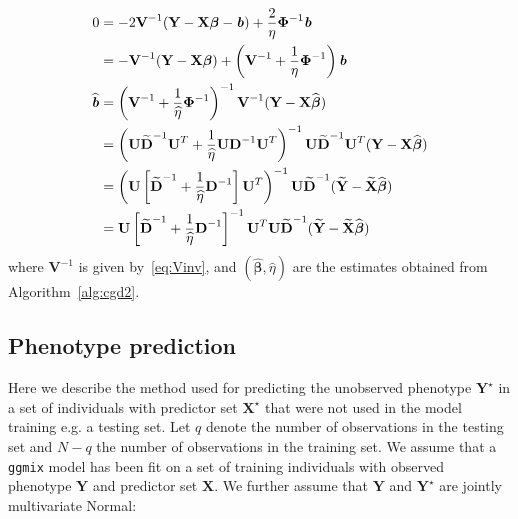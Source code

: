 \documentclass[12pt,letter]{article}\usepackage[]{graphicx}\usepackage[]{color}
\newcommand{\bX}{\textbf{X}}
\newcommand{\bY}{\textbf{Y}}
\newcommand{\bD}{\textbf{D}}
\newcommand{\bXtilde}{\widetilde{\bX}}
\newcommand{\bYtilde}{\widetilde{\bY}}
\newcommand{\bDtilde}{\widetilde{\bD}}
\newcommand{\bU}{\textbf{U}}
\newcommand{\bV}{\textbf{V}}
\newcommand{\bb}{\textbf{\emph{b}}}
\newcommand{\bbeta}{\boldsymbol{\beta}}
\newcommand{\bPhi}{\boldsymbol{\Phi}}
\begin{document}
\begin{align}
	0 & = -2 \bV^{-1} (\bY - \bX \bbeta - \bb) + \frac{2}{\eta} \bPhi^{-1}\bb \nonumber \\
	& = -\bV^{-1}  (\bY - \bX \bbeta ) + \left(\bV^{-1} + \frac{1}{\eta}\bPhi^{-1}\right) \bb  \nonumber\\
	\widehat{\bb} & = \left(\bV^{-1} + \frac{1}{\widehat{\eta}}\bPhi^{-1}\right)^{-1}\bV^{-1}  (\bY - \bX \widehat{\bbeta} ) \nonumber \\
	& = \left(\bU \bDtilde^{-1} \bU^T + \frac{1}{\widehat{\eta}}\bU \bD^{-1} \bU^T\right)^{-1} \bU \bDtilde^{-1} \bU^T (\bY - \bX \widehat{\bbeta} ) \nonumber \\
	& = \left(\bU \left[\bDtilde^{-1} + \frac{1}{\widehat{\eta}} \bD^{-1} \right] \bU^T \right)^{-1} \bU \bDtilde^{-1} (\bYtilde - \bXtilde \widehat{\bbeta} ) \nonumber \\
	& = \bU \left[\bDtilde^{-1} + \frac{1}{\widehat{\eta}} \bD^{-1} \right]^{-1} \bU^T \bU \bDtilde^{-1} (\bYtilde - \bXtilde \widehat{\bbeta} ) \nonumber
\end{align}
where $\bV^{-1}$ is given by~\eqref{eq:Vinv}, and $(\widehat{\bbeta}, \widehat{\eta})$ are the estimates obtained from Algorithm~\ref{alg:cgd2}.



\subsection{Phenotype prediction} \label{phenoprediction}

Here we describe the method used for predicting the unobserved phenotype $\bY^\star$ in a set of individuals with predictor set $\bX^\star$ that were not used in the model training e.g. a testing set. Let $q$ denote the number of observations in the testing set and $N-q$ the number of observations in the training set. We assume that a \texttt{ggmix} model has been fit on a set of training individuals with observed phenotype $\bY$ and predictor set $\bX$.  We further assume that $\bY$ and $\bY^\star$ are jointly multivariate Normal:
\end{document}
